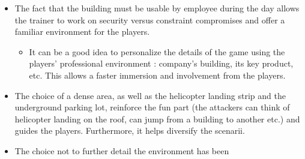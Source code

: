 \documentclass[11pt]{article} %
\begin{document}
\begin{itemize}
\item The fact that the building must be usable by employee during the day allows the trainer to work on security versus constraint compromises and offer a familiar environment for the players.
	\begin{itemize}	
	\item It can be a good idea to personalize the details of the game using the players' professional 
	environment : company's building, its key product, etc. This allows a faster immersion
	and involvement from the players.
	\end{itemize}
\item The choice of a dense area, as well as the helicopter landing strip 
and the underground parking lot, reinforce the fun part 
(the attackers can think of helicopter landing on the roof, 
can jump from a building to another etc.) 
and guides the players. Furthermore, it helps diversify the scenarii. 
\item The choice not to further detail the environment has been 

\end{itemize}
\end{document}
